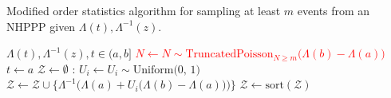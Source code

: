 \begin{algorithm}[h!]
\caption{Modified order statistics algorithm for sampling at least $m$ events from an NHPPP given $\Lambda(t), \Lambda^{-1}(z)$.}\label{alg:NHPPP_conditional}
\begin{algorithmic}[1]
\Require $\Lambda(t), \Lambda^{-1}(z), t \in (a, b]$ 
\State \textcolor{red}{$N \gets N \sim \textrm{TruncatedPoisson}_{N \ge m}\big(\Lambda(b)-\Lambda(a)\big)$ }
\State $t \gets a$
\State $\mathcal{Z} \gets \emptyset$ 
    :
        \State $U_i \gets U_i \sim \textrm{Uniform(0, 1)}$ 
        \State $\mathcal{Z} \gets \mathcal{Z} \cup \{ \Lambda^{-1} \Big( \Lambda(a) + U_i \big( \Lambda(b) - \Lambda(a) \big)\Big) \} $ 
    \EndFor
    \State $\mathcal{Z} \gets \textrm{sort}(\mathcal{Z})$ 
\EndIf
\State
{} 
\end{algorithmic}
\end{algorithm}
